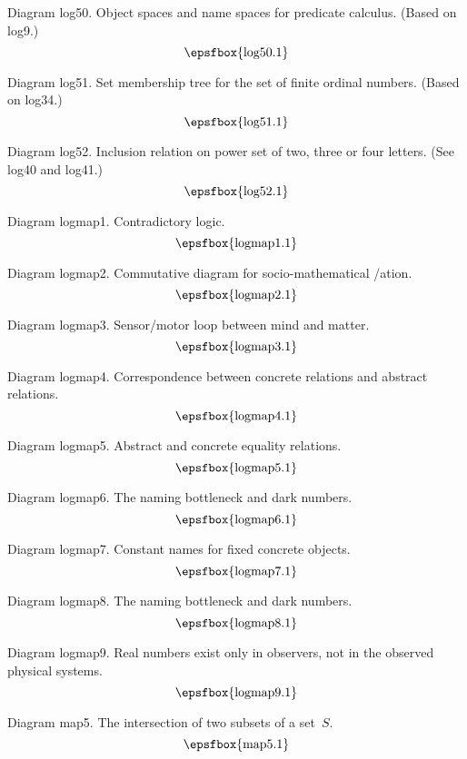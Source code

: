 Diagram log50. Object spaces and name spaces for predicate calculus. (Based on
log9.)
$$
\centerline{\epsfbox{log50.1}}
$$

Diagram log51. Set membership tree for the set of finite ordinal numbers. (Based
on log34.)
$$
\centerline{\epsfbox{log51.1}}
$$

\filleject

Diagram log52. Inclusion relation on power set of two, three or four letters.
(See log40 and log41.)
$$
\centerline{\epsfbox{log52.1}}
$$

\secteject
\edef\SECTlogmap{\the\pageno}

Diagram logmap1. Contradictory logic.
$$
\centerline{\epsfbox{logmap1.1}}
$$

Diagram logmap2. Commutative diagram for socio-mathematical \synchronis/ation.
$$
\centerline{\epsfbox{logmap2.1}}
$$

Diagram logmap3. Sensor/motor loop between mind and matter.
$$
\centerline{\epsfbox{logmap3.1}}
$$

Diagram logmap4. Correspondence between concrete relations and abstract
relations.
$$
\centerline{\epsfbox{logmap4.1}}
$$

\filleject

Diagram logmap5. Abstract and concrete equality relations.
$$
\centerline{\epsfbox{logmap5.1}}
$$

Diagram logmap6. The naming bottleneck and dark numbers.
$$
\centerline{\epsfbox{logmap6.1}}
$$

Diagram logmap7. Constant names for fixed concrete objects.
$$
\centerline{\epsfbox{logmap7.1}}
$$

Diagram logmap8. The naming bottleneck and dark numbers.
$$
\centerline{\epsfbox{logmap8.1}}
$$

\filleject

Diagram logmap9. Real numbers exist only in observers, not in the observed
physical systems.
$$
\centerline{\epsfbox{logmap9.1}}
$$

\secteject
\edef\SECTmap{\the\pageno}

Diagram map5. The intersection of two subsets of a set~$S$.
$$
\centerline{\epsfbox{map5.1}}
$$

